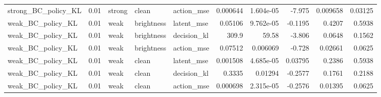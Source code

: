 \begin{tabular}{lrlllrrrrr}
strong\_BC\_policy\_KL & 0.01 & strong & clean & action\_mse & 0.000644 & 1.604e-05 & -7.975 & 0.009658 & 0.03125 \\
weak\_BC\_policy\_KL & 0.01 & weak & brightness & latent\_mse & 0.05106 & 9.762e-05 & -0.1195 & 0.4207 & 0.5938 \\
weak\_BC\_policy\_KL & 0.01 & weak & brightness & decision\_kl & 309.9 & 59.58 & -3.806 & 0.0648 & 0.1562 \\
weak\_BC\_policy\_KL & 0.01 & weak & brightness & action\_mse & 0.07512 & 0.006069 & -0.728 & 0.02661 & 0.0625 \\
weak\_BC\_policy\_KL & 0.01 & weak & clean & latent\_mse & 0.001508 & 4.685e-05 & 0.03795 & 0.2386 & 0.5938 \\
weak\_BC\_policy\_KL & 0.01 & weak & clean & decision\_kl & 0.3335 & 0.01294 & -0.2577 & 0.1761 & 0.2188 \\
weak\_BC\_policy\_KL & 0.01 & weak & clean & action\_mse & 0.000698 & 2.315e-05 & -0.2576 & 0.01395 & 0.0625 \\
\bottomrule
\end{tabular}
